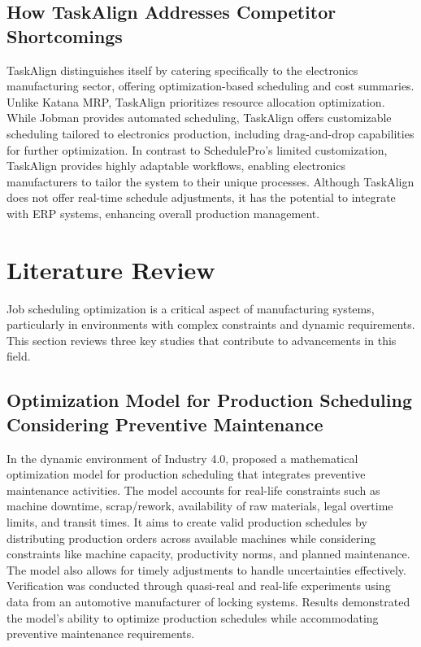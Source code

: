 \subsection{How TaskAlign Addresses Competitor Shortcomings}
TaskAlign distinguishes itself by catering specifically to the electronics manufacturing sector, offering optimization-based scheduling and cost summaries. Unlike Katana MRP, TaskAlign prioritizes resource allocation optimization. While Jobman provides automated scheduling, TaskAlign offers customizable scheduling tailored to electronics production, including drag-and-drop capabilities for further optimization. In contrast to SchedulePro's limited customization, TaskAlign provides highly adaptable workflows, enabling electronics manufacturers to tailor the system to their unique processes. Although TaskAlign does not offer real-time schedule adjustments, it has the potential to integrate with ERP systems, enhancing overall production management.


\section{Literature Review}
\label{section:literature-review}

Job scheduling optimization is a critical aspect of manufacturing systems, particularly in environments with complex constraints and dynamic requirements. This section reviews three key studies that contribute to advancements in this field.

\subsection{Optimization Model for Production Scheduling Considering Preventive Maintenance}
In the dynamic environment of Industry 4.0, \cite{optimization2023} proposed a mathematical optimization model for production scheduling that integrates preventive maintenance activities. The model accounts for real-life constraints such as machine downtime, scrap/rework, availability of raw materials, legal overtime limits, and transit times. It aims to create valid production schedules by distributing production orders across available machines while considering constraints like machine capacity, productivity norms, and planned maintenance. The model also allows for timely adjustments to handle uncertainties effectively. Verification was conducted through quasi-real and real-life experiments using data from an automotive manufacturer of locking systems. Results demonstrated the model's ability to optimize production schedules while accommodating preventive maintenance requirements.

